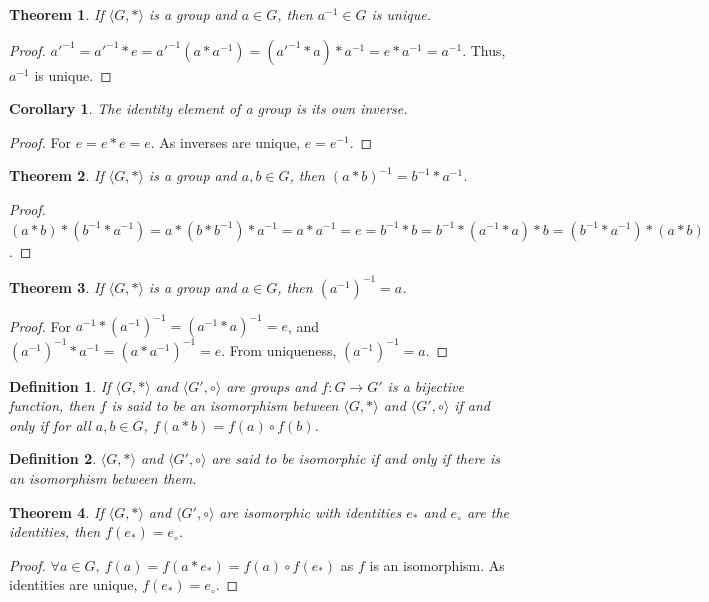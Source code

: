 \documentclass[oneside]{book}
\theoremstyle{mystyle}
\newtheorem{theorem}{Theorem}[section]
\newtheorem{definition}{Definition}[section]
\newtheorem{corollary}{Corollary}[section]
\begin{document}
\begin{theorem}
If $\langle G, * \rangle$ is a group and $a\in G$, then $a^{-1}\in G$ is unique.
\end{theorem}
\begin{proof}
$a'^{-1} = a'^{-1}*e = a'^{-1}(a*a^{-1}) = (a'^{-1}*a)*a^{-1} = e*a^{-1} = a^{-1}$. Thus, $a^{-1}$ is unique.
\end{proof}

\begin{corollary}
The identity element of a group is its own inverse.
\end{corollary}
\begin{proof}
For $e=e*e = e$. As inverses are unique, $e=e^{-1}$.
\end{proof}

\begin{theorem}
If $\langle G,*\rangle$ is a group and $a,b\in G$, then $(a*b)^{-1} = b^{-1}*a^{-1}$.
\end{theorem}
\begin{proof}
$(a*b)*(b^{-1}*a^{-1}) = a*(b*b^{-1})*a^{-1} = a*a^{-1} = e=b^{-1}*b=b^{-1}*(a^{-1}*a)*b=(b^{-1}*a^{-1})*(a*b)  $.
\end{proof}

\begin{theorem}
If $\langle G,* \rangle$ is a group and $a\in G$, then $(a^{-1})^{-1} = a$.
\end{theorem}
\begin{proof}
For $a^{-1}*(a^{-1})^{-1} = (a^{-1}* a)^{-1} = e$, and $(a^{-1})^{-1}*a^{-1} = (a*a^{-1})^{-1} = e$. From uniqueness, $(a^{-1})^{-1} = a$.
\end{proof}

\begin{definition}
If $\langle G, * \rangle$ and $\langle G',\circ \rangle$ are groups and $f:G\rightarrow G'$ is a bijective function, then $f$ is said to be an isomorphism between $\langle G, * \rangle$ and $\langle G',\circ \rangle$ if and only if for all $a,b\in G$, $f(a*b) =f(a)\circ f(b)$.
\end{definition}

\begin{definition}
$\langle G, *\rangle$ and $\langle G', \circ \rangle$ are said to be isomorphic if and only if there is an isomorphism between them.
\end{definition}

\begin{theorem}
If $\langle G, * \rangle$ and $\langle G', \circ \rangle$ are isomorphic with identities $e_*$ and $e_{\circ}$ are the identities, then $f(e_*) = e_{\circ}$.
\end{theorem}
\begin{proof}
$\forall a\in G,\ f(a)=f(a* e_*) = f(a)\circ f(e_*)$ as $f$ is an isomorphism. As identities are unique, $f(e_*) = e_{\circ}$.
\end{proof}
\end{document}
